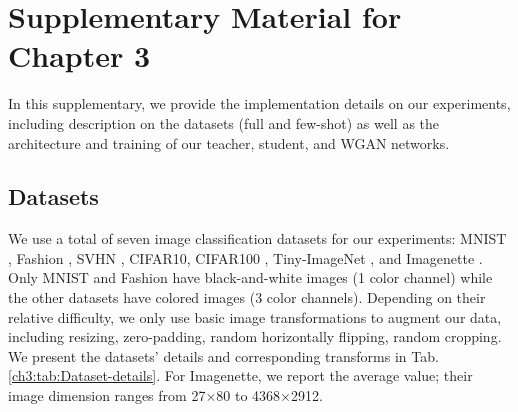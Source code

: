 \chapter{Supplementary Material for Chapter 3}
\label{ch:81-appendix-research01}

\begin{foldable}
    In this supplementary, we provide the implementation details on our experiments, including description on the datasets (full and few-shot) as well as the architecture and training of our teacher, student, and WGAN networks.
\end{foldable}

\section{Datasets}
\begin{foldable}
    We use a total of seven image classification datasets for our experiments: MNIST \cite{lecun1998gradient}, Fashion \cite{xiao2017fashion}, SVHN \cite{netzer2011reading}, CIFAR10, CIFAR100 \cite{krizhevsky2009learning}, Tiny-ImageNet \cite{le2015tiny}, and Imagenette \cite{howard2020imagenette}.
    Only MNIST and Fashion have black-and-white images (1 color channel) while the other datasets have colored images (3 color channels).
    Depending on their relative difficulty, we only use basic image transformations to augment our data, including resizing, zero-padding, random horizontally flipping, random cropping.
    We present the datasets' details and corresponding transforms in Tab. \ref{ch3:tab:Dataset-details}.
    For Imagenette, we report the average value; their image dimension ranges from 27$\times$80 to 4368$\times$2912.
\end{foldable}


